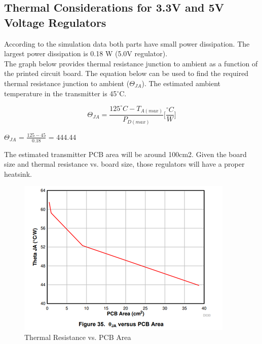 \documentclass[12pt]{article}
\begin{document}
\pagebreak

\subsection{Thermal Considerations for 3.3V and 5V Voltage Regulators}

\indent \indent
According to the simulation data both parts have small power dissipation. The largest power dissipation is 0.18 W (5.0V regulator).\\

\indent
The graph below provides thermal resistance junction to ambient as a function of the printed circuit board. The equation below can be used to find the required thermal resistance junction to ambient ($\Theta_{JA}$). The estimated ambient temperature in the transmitter is 45$^{\circ}$C.

\begin{equation}
\Theta_{JA} = \frac{125^\circ C - T_{A(max)}}{P_{D(max)}} \Bigg[\frac{^\circ C}{W}\Bigg]
\end{equation}

\noindent
$\Theta_{JA}$ = $\frac{125-45}{0.18}$ = 444.44 

\noindent
The estimated transmitter PCB area will be around 100cm2. Given the board size and thermal resistance vs. board size, those regulators will have a proper heatsink.

\begin{figure}[h!]
\centering
\includegraphics[width=0.9\linewidth]{pcb_JA_theta}
\caption{Thermal Resistance vs. PCB Area \cite{TPSM265R1}}
\end{figure}

\pagebreak
\end{document}
